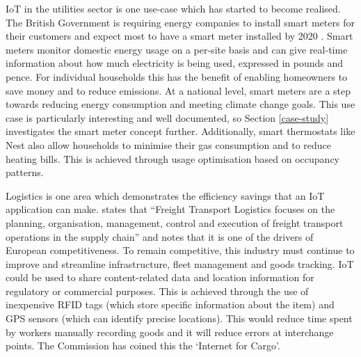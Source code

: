     IoT in the utilities sector is one use-case which has started to become realised. The British Government is requiring energy companies to install smart meters for their customers and expect most to have a smart meter installed by 2020 \citep{DoECC:2013}. Smart meters monitor domestic energy usage on a per-site basis and can give real-time information about how much electricity is being used, expressed in pounds and pence. For individual households this has the benefit of enabling homeowners to save money and to reduce emissions. At a national level, smart meters are a step towards reducing energy consumption and meeting climate change goals. This use case is particularly interesting and well documented, so Section \ref{case-study} investigates the smart meter concept further. Additionally, smart thermostats like Nest also allow households to minimise their gas consumption and to reduce heating bills. This is achieved through usage optimisation based on occupancy patterns. 

    Logistics is one area which demonstrates the efficiency savings that an IoT application can make. \citet{ECFreight:2007} states that ``Freight Transport Logistics focuses on the planning, organisation, management, control and execution of freight transport operations in the supply chain'' and notes that it is one of the drivers of European competitiveness. To remain competitive, this industry must continue to improve and streamline infrastructure, fleet management and goods tracking. IoT could be used to share content-related data and location information for regulatory or commercial purposes. This is achieved through the use of inexpensive RFID tags (which store specific information about the item) and GPS sensors (which can identify precise locations). This would reduce time spent by workers manually recording goods and it will reduce errors at interchange points. The Commission has coined this the `Internet for Cargo'.

